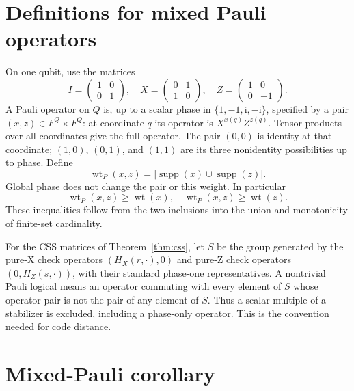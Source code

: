 \documentclass{article}
\DeclareMathOperator{\wt}{wt}
\DeclareMathOperator{\supp}{supp}
\begin{document}
\section{Definitions for mixed Pauli operators}\label{sec:pauli-definitions}

On one qubit, use the matrices
\begin{equation}
  I = \begin{pmatrix} 1 & 0 \\ 0 & 1 \end{pmatrix}, \quad
  X = \begin{pmatrix} 0 & 1 \\ 1 & 0 \end{pmatrix}, \quad
  Z = \begin{pmatrix} 1 & 0 \\ 0 & -1 \end{pmatrix}.
\end{equation}
A Pauli operator on \(Q\) is, up to a scalar phase in
\(\{1, -1, \mathrm{i}, -\mathrm{i}\}\), specified by a pair
\((x, z) \in F^Q \times F^Q\): at coordinate \(q\) its operator is
\(X^{x(q)} Z^{z(q)}\). Tensor products over all coordinates give the full operator. The
pair \((0, 0)\) is identity at that coordinate; \((1, 0)\), \((0, 1)\), and \((1, 1)\) are
its three nonidentity possibilities up to phase. Define
\begin{equation}
  \wt_P(x, z) = \lvert\supp(x) \cup \supp(z)\rvert.
\end{equation}
Global phase does not change the pair or this weight. In particular
\begin{equation}
  \wt_P(x, z) \ge \wt(x), \quad \wt_P(x, z) \ge \wt(z).
\end{equation}
These inequalities follow from the two inclusions into the union and monotonicity of
finite-set cardinality.

For the CSS matrices of Theorem~\ref{thm:css}, let \(S\) be the group generated by the
pure-X check operators \((H_X(r, \cdot), 0)\) and pure-Z check operators
\((0, H_Z(s, \cdot))\), with their standard phase-one representatives. A nontrivial Pauli
logical means an operator commuting with every element of \(S\) whose operator pair is not
the pair of any element of \(S\). Thus a scalar multiple of a stabilizer is excluded,
including a phase-only operator. This is the convention needed for code distance.

\section{Mixed-Pauli corollary}\label{sec:pauli}
\end{document}
